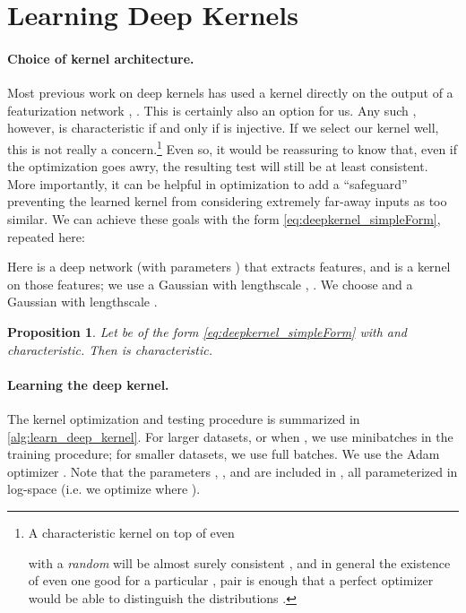 \documentclass{article}
\newtheorem{prop}[theorem]{Proposition}  \crefname{prop}{Proposition}{Propositions}
\begin{document}
\section{Learning Deep Kernels}\label{sec:DKforTST}


\paragraph{Choice of kernel architecture.} \label{sec:kernel-arch}
Most previous work on deep kernels has used a kernel  directly on the output of a featurization network ,
.
This is certainly also an option for us.
Any such , however, is characteristic if and only if  is injective.
If we select our kernel well, this is not really a concern.\footnote{A characteristic kernel on top of even

with a \emph{random} 
will be almost surely consistent \citep{Heller2016},
and in general the existence of even one good  for a particular ,  pair is enough that a perfect optimizer would be able to distinguish the distributions
\citep[Proposition 1]{MMD_GAN2}.}{}
Even so, it would be reassuring to know that,
even if the optimization goes awry,
the resulting test will still be at least consistent.
More importantly,
it can be helpful in optimization to add a ``safeguard'' preventing the learned kernel from considering extremely far-away inputs as too similar.
We can achieve these goals with the form \eqref{eq:deepkernel_simpleForm},
repeated here:

Here  is a deep network (with parameters ) that extracts features,
and  is a kernel on those features;
we use a Gaussian with lengthscale ,
.
We choose  and
 a Gaussian with lengthscale .
\begin{prop} Let  be of the form \eqref{eq:deepkernel_simpleForm}
with  and  characteristic.
Then  is characteristic.
\end{prop}









\paragraph{Learning the deep kernel.}
The kernel optimization and testing procedure is summarized in \cref{alg:learn_deep_kernel}.
For larger datasets, or when ,
we use minibatches in the training procedure;
for smaller datasets, we use full batches.
We use the Adam optimizer \citep{Adam:optimizer}.
Note that the parameters , , and 
are included in ,
all parameterized in log-space
(i.e. we optimize  where ).
\end{document}
